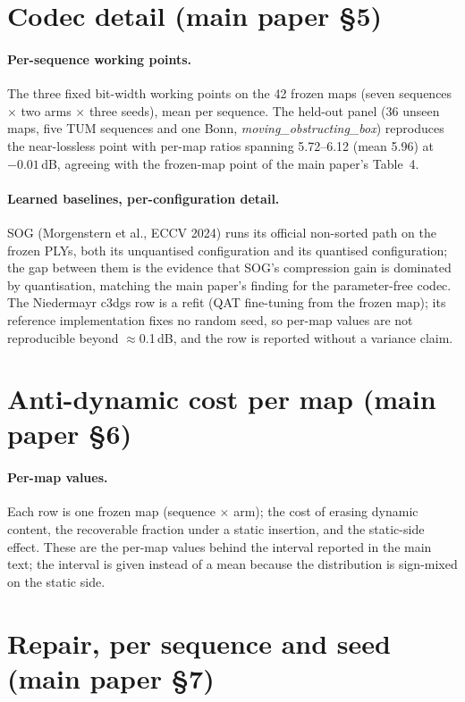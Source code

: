 \documentclass[11pt]{article}
\begin{document}
\section{Codec detail (main paper \S5)}
\paragraph{Per-sequence working points.} The three fixed bit-width working points on
the 42 frozen maps (seven sequences $\times$ two arms $\times$ three seeds), mean
per sequence. The held-out panel (36 unseen maps, five TUM sequences and one Bonn,
\emph{moving\_obstructing\_box})
reproduces the near-lossless point with per-map ratios spanning 5.72--6.12
(mean 5.96) at $-0.01$\,dB, agreeing with the frozen-map point of the
main paper's Table~4.

\paragraph{Learned baselines, per-configuration detail.} SOG (Morgenstern et al.,
ECCV 2024) runs its official non-sorted path on the frozen PLYs, both its
unquantised configuration and its quantised configuration; the gap between them is
the evidence that SOG's compression gain is dominated by quantisation, matching the
main paper's finding for the parameter-free codec. The Niedermayr c3dgs row is a
refit (QAT fine-tuning from the frozen map); its reference implementation fixes no
random seed, so per-map values are not reproducible beyond $\approx$0.1\,dB, and the
row is reported without a variance claim.


\section{Anti-dynamic cost per map (main paper \S6)}
\paragraph{Per-map values.} Each row is one frozen map (sequence $\times$ arm); the
cost of erasing dynamic content, the recoverable fraction under a static insertion,
and the static-side effect. These are the per-map values behind the interval
reported in the main text; the interval is given instead of a mean because the
distribution is sign-mixed on the static side.


\section{Repair, per sequence and seed (main paper \S7)}
\end{document}

